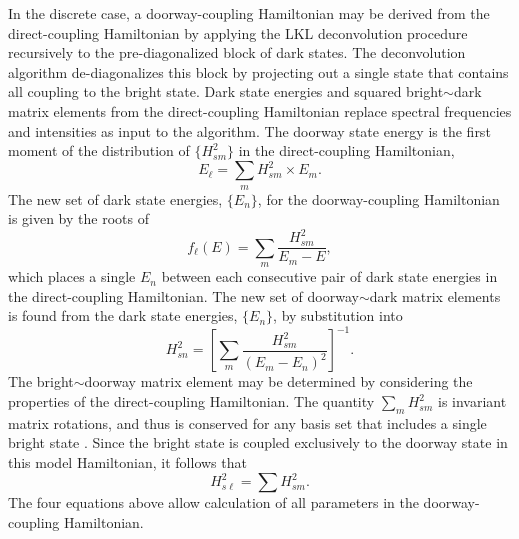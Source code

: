 In the discrete case, a doorway-coupling Hamiltonian may be derived
from the direct-coupling Hamiltonian by applying the LKL deconvolution
procedure recursively to the pre-diagonalized block of dark states.
The deconvolution algorithm de-diagonalizes this block by projecting
out a single state that contains all coupling to the bright state.
Dark state energies and squared bright$\sim$dark matrix elements from
the direct-coupling Hamiltonian replace spectral frequencies and
intensities as input to the algorithm.  The doorway state energy is
the first moment of the distribution of $\lbrace H_{sm}^2 \rbrace$ in
the direct-coupling Hamiltonian,
\begin{equation}
  \label{eq:dse-discrete}
  E_{\ell} = \sum_m H_{sm}^2 \times E_m.
\end{equation}
The new set of dark state energies, $\lbrace E_n \rbrace$, for the
doorway-coupling Hamiltonian is given by the roots of
\begin{equation}
  f_{\ell}(E) = \sum_m \frac{H_{sm}^2}{E_m - E},
\end{equation}
which places a single $E_n$ between each consecutive pair of dark
state energies in the direct-coupling Hamiltonian.  The new set of
doorway$\sim$dark matrix elements is found from the dark state
energies, $\lbrace E_n \rbrace$, by substitution into
\begin{equation}
  H_{sn}^2 = 
  \left [
    \sum_m \frac{H_{sm}^2}{(E_m - E_n)^2}
  \right ]^{-1}.
\end{equation}
The bright$\sim$doorway matrix element may be determined by
considering the properties of the direct-coupling Hamiltonian.  The
quantity $\sum_m H_{sm}^2$ is invariant matrix rotations, and thus is
conserved for any basis set that includes a single bright state
\cite{lehmann91}.  Since the bright state is coupled exclusively to
the doorway state in this model Hamiltonian, it follows that
\begin{equation}
  \label{eq:doorway-me}
  H_{s\ell}^2 = \sum H_{sm}^2.
\end{equation}
The four equations above allow calculation of all parameters in
the doorway-coupling Hamiltonian.


